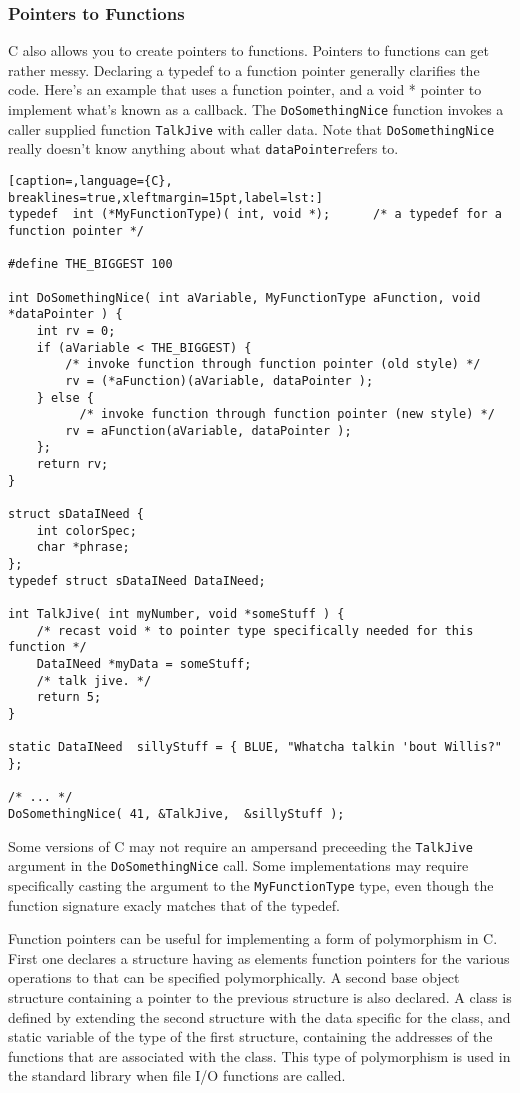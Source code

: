 \subsubsection{Pointers to Functions}
C also allows you to create pointers to functions. Pointers to functions can
get rather messy. Declaring a typedef to a function pointer generally clarifies
the code. Here's an example that uses a function pointer, and a void * pointer
to implement what's known as a callback. The \texttt{DoSomethingNice} function
invokes a caller supplied function \texttt{TalkJive} with caller data. Note
that \texttt{DoSomethingNice} really doesn't know anything about what
\texttt{dataPointer}refers to.
\lstset{basicstyle=\scriptsize, numbers=left, captionpos=b, tabsize=4}
\begin{lstlisting}[caption=,language={C},
breaklines=true,xleftmargin=15pt,label=lst:]
typedef  int (*MyFunctionType)( int, void *);      /* a typedef for a function pointer */

#define THE_BIGGEST 100

int DoSomethingNice( int aVariable, MyFunctionType aFunction, void *dataPointer ) {
	int rv = 0;
	if (aVariable < THE_BIGGEST) {
		/* invoke function through function pointer (old style) */
		rv = (*aFunction)(aVariable, dataPointer );
	} else {
		  /* invoke function through function pointer (new style) */
		rv = aFunction(aVariable, dataPointer );
	};
	return rv;
}

struct sDataINeed {
	int colorSpec;
	char *phrase;
};
typedef struct sDataINeed DataINeed;

int TalkJive( int myNumber, void *someStuff ) {
	/* recast void * to pointer type specifically needed for this function */
	DataINeed *myData = someStuff;
	/* talk jive. */
	return 5;
}

static DataINeed  sillyStuff = { BLUE, "Whatcha talkin 'bout Willis?" };

/* ... */
DoSomethingNice( 41, &TalkJive,  &sillyStuff );
\end{lstlisting}

Some versions of C may not require an ampersand preceeding the
\texttt{TalkJive} argument in the \texttt{DoSomethingNice} call. Some
implementations may require specifically casting the argument to the
\texttt{MyFunctionType} type, even though the function signature exacly matches
that of the typedef.

Function pointers can be useful for implementing a form of polymorphism in C.
First one declares a structure having as elements function pointers for the
various operations to that can be specified polymorphically. A second base
object structure containing a pointer to the previous structure is also
declared. A class is defined by extending the second structure with the data
specific for the class, and static variable of the type of the first structure,
containing the addresses of the functions that are associated with the class.
This type of polymorphism is used in the standard library when file I/O
functions are called.

